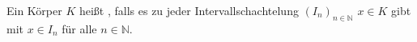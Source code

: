 Ein Körper $K$ heißt , falls es zu jeder Intervallschachtelung $(I_n)_{n \in \mathbb{N}}$  $x \in K$ gibt mit $x \in I_n$ für alle $n \in \mathbb{N}$.